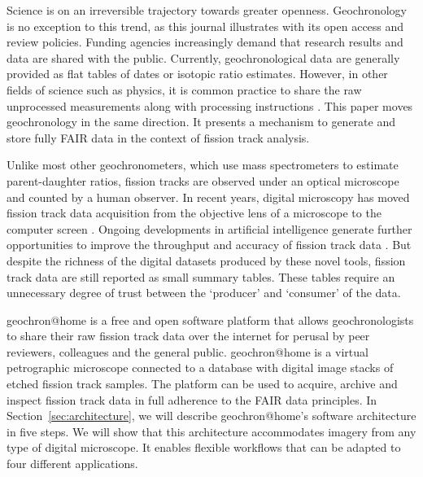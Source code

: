 \documentclass[gchron, manuscript]{copernicus}
\begin{document}
\introduction\label{sec:intro}

Science is on an irreversible trajectory towards greater
openness. Geochronology is no exception to this trend, as this journal
illustrates with its open access and review policies. Funding agencies
increasingly demand that research results and data are shared with the
public. Currently, geochronological data are generally provided as
flat tables of dates or isotopic ratio estimates. However, in other
fields of science such as physics, it is common practice to share the
raw unprocessed measurements along with processing instructions
\citep[e.g.,][]{abbott2016}. This paper moves geochronology in the
same direction. It presents a mechanism to generate and store fully
FAIR \citep[Findable, Accessible, Interoperable and
  Reproducible;][]{wilkinson2016} data in the context of fission track
analysis.\medskip

Unlike most other geochronometers, which use mass spectrometers to
estimate parent-daughter ratios, fission tracks are observed under an
optical microscope and counted by a human observer.  In recent years,
digital microscopy has moved fission track data acquisition from the
objective lens of a microscope to the computer screen
\citep{gleadow2009, vanranst2019, gleadow2019}. Ongoing developments
in artificial intelligence generate further opportunities to improve
the throughput and accuracy of fission track data
\citep{nachtergaele2020}. But despite the richness of the digital
datasets produced by these novel tools, fission track data are still
reported as small summary tables. These tables require an unnecessary
degree of trust between the `producer' and `consumer' of the
data.\medskip

geochron@home is a free and open software platform that allows
geochronologists to share their raw fission track data over the
internet for perusal by peer reviewers, colleagues and the general
public. geochron@home is a virtual petrographic microscope connected to a
database with digital image stacks of etched fission track
samples. The platform can be used to acquire, archive and inspect
fission track data in full adherence to the FAIR data principles. In
Section~\ref{sec:architecture}, we will describe geochron@home's software
architecture in five steps. We will show that this architecture
accommodates imagery from any type of digital microscope. It enables
flexible workflows that can be adapted to four different
applications.\medskip
\end{document}

